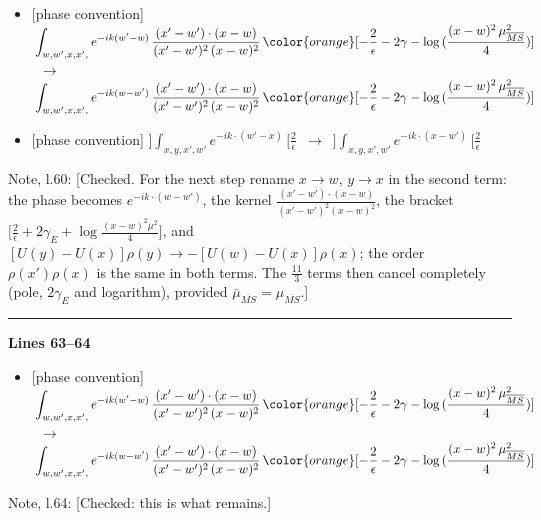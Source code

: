 \documentclass[10pt]{article}
\newenvironment{notebox}{\def\FrameCommand{{\color{notebar}\vrule width 1.5pt}\hspace{6pt}}\MakeFramed{\advance\hsize-\width\FrameRestore}\small}{\endMakeFramed}
\begin{document}
\begin{itemize}[leftmargin=2.2em,itemsep=1pt,topsep=2pt]
\item[\textbf{l.59}] \textsf{\small [phase convention]} $\displaystyle \, \int_{w, w',x,x',} e^{-ik(w^\prime-w)}\, \frac{(x'-w')\cdot (x-w)}{(x'-w')^{2}\, (x-w)^{2}}\, {\color{orange}[-\frac{2}{\epsilon}-2\gamma-\log{(\frac{(x-w)^{2}\,\mu^{2}_{\overline{MS}}}{4})}]}$\ $\longrightarrow$\ $\displaystyle \, \int_{w, w',x,x',} e^{-ik(w-w^\prime)}\, \frac{(x'-w')\cdot (x-w)}{(x'-w')^{2}\, (x-w)^{2}}\, {\color{orange}[-\frac{2}{\epsilon}-2\gamma-\log{(\frac{(x-w)^{2}\,\mu^{2}_{\overline{MS}}}{4})}]}$
\item[\textbf{l.59}] \textsf{\small [phase convention]} $\displaystyle ]\int_{x,y,x',w'}e^{-ik\cdot(w'-x)}\,[\frac{2}{\epsilon}$\ $\longrightarrow$\ $\displaystyle ]\int_{x,y,x',w'}e^{-ik\cdot(x-w')}\,[\frac{2}{\epsilon}$
\end{itemize}
\begin{notebox}\textsf{\small Note, l.60:} [Checked. For the next step rename $x\to w$, $y\to x$ in the second term: the phase becomes $e^{-ik\cdot(w-w')}$, the kernel $\frac{(x'-w')\cdot(x-w)}{(x'-w')^{2}(x-w)^{2}}$, the bracket $\big[\frac{2}{\epsilon}+2\gamma_{E}+\log\frac{(x-w)^{2}\mu^{2}}{4}\big]$, and $[U(y)-U(x)]\rho(y)\to-[U(w)-U(x)]\rho(x)$; the order $\rho(x')\rho(x)$ is the same in both terms. The $\frac{11}{3}$ terms then cancel completely (pole, $2\gamma_{E}$ and logarithm), provided $\bar\mu_{\overline{MS}}=\mu_{\overline{MS}}$.]\end{notebox}
\noindent\rule{\linewidth}{0.3pt}\par\noindent\textbf{Lines 63--64} \par
\begin{itemize}[leftmargin=2.2em,itemsep=1pt,topsep=2pt]
\item[\textbf{l.63}] \textsf{\small [phase convention]} $\displaystyle \, \int_{w, w',x,x',} e^{-ik(w^\prime-w)}\, \frac{(x'-w')\cdot (x-w)}{(x'-w')^{2}\, (x-w)^{2}}\, {\color{orange}[-\frac{2}{\epsilon}-2\gamma-\log{(\frac{(x-w)^{2}\,\mu^{2}_{\overline{MS}}}{4})}]}$\ $\longrightarrow$\ $\displaystyle \, \int_{w, w',x,x',} e^{-ik(w-w^\prime)}\, \frac{(x'-w')\cdot (x-w)}{(x'-w')^{2}\, (x-w)^{2}}\, {\color{orange}[-\frac{2}{\epsilon}-2\gamma-\log{(\frac{(x-w)^{2}\,\mu^{2}_{\overline{MS}}}{4})}]}$
\end{itemize}
\begin{notebox}\textsf{\small Note, l.64:} [Checked: this is what remains.]\end{notebox}
\end{document}
